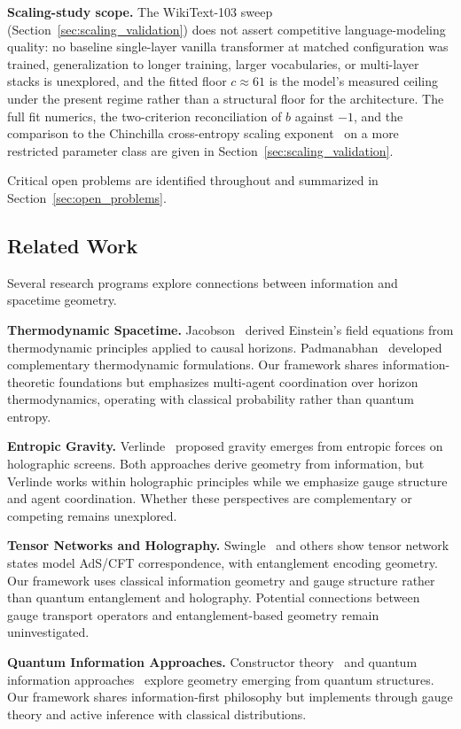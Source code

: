 \documentclass[11pt]{article}
\begin{document}
\textbf{Scaling-study scope.} The WikiText-103 sweep (Section~\ref{sec:scaling_validation}) does not assert competitive language-modeling quality: no baseline single-layer vanilla transformer at matched configuration was trained, generalization to longer training, larger vocabularies, or multi-layer stacks is unexplored, and the fitted floor $c \approx 61$ is the model's measured ceiling under the present regime rather than a structural floor for the architecture. The full fit numerics, the two-criterion reconciliation of $b$ against $-1$, and the comparison to the Chinchilla cross-entropy scaling exponent~\cite{HoffmannChinchilla2022} on a more restricted parameter class are given in Section~\ref{sec:scaling_validation}.

Critical open problems are identified throughout and summarized in Section~\ref{sec:open_problems}.

\subsection{Related Work}

Several research programs explore connections between information and spacetime geometry.

\textbf{Thermodynamic Spacetime.} Jacobson~\cite{Jacobson1995} derived Einstein's field equations from thermodynamic principles applied to causal horizons. Padmanabhan~\cite{Padmanabhan2010} developed complementary thermodynamic formulations. Our framework shares information-theoretic foundations but emphasizes multi-agent coordination over horizon thermodynamics, operating with classical probability rather than quantum entropy.

\textbf{Entropic Gravity.} Verlinde~\cite{Verlinde2011} proposed gravity emerges from entropic forces on holographic screens. Both approaches derive geometry from information, but Verlinde works within holographic principles while we emphasize gauge structure and agent coordination. Whether these perspectives are complementary or competing remains unexplored.

\textbf{Tensor Networks and Holography.} Swingle~\cite{Swingle2012} and others show tensor network states model AdS/CFT correspondence, with entanglement encoding geometry. Our framework uses classical information geometry and gauge structure rather than quantum entanglement and holography. Potential connections between gauge transport operators and entanglement-based geometry remain uninvestigated.

\textbf{Quantum Information Approaches.} Constructor theory~\cite{Deutsch2015} and quantum information approaches~\cite{Cao2017} explore geometry emerging from quantum structures. Our framework shares information-first philosophy but implements through gauge theory and active inference with classical distributions.
\end{document}
